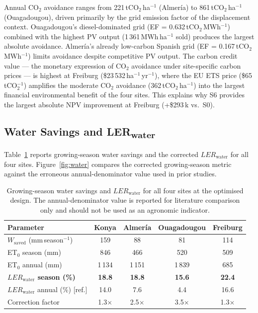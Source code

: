 \hspace{1cm}Annual CO$_2$ avoidance ranges from
221\,tCO$_2$\,ha$^{-1}$ (Almer\'{i}a) to
861\,tCO$_2$\,ha$^{-1}$ (Ouagadougou), driven primarily by the
grid emission factor of the displacement context. Ouagadougou's
diesel-dominated grid (EF = 0.632\,tCO$_2$\,MWh$^{-1}$) combined
with the highest PV output (1\,361\,MWh\,ha$^{-1}$ sold) produces
the largest absolute avoidance. Almer\'{i}a's already low-carbon
Spanish grid (EF = 0.167\,tCO$_2$\,MWh$^{-1}$) limits avoidance
despite competitive PV output. The carbon credit value --- the
monetary expression of CO$_2$ avoidance under site-specific carbon
prices --- is highest at Freiburg (\$23\,532\,ha$^{-1}$\,yr$^{-1}$),
where the EU ETS price (\$65\,tCO$_2^{-1}$) amplifies the moderate
CO$_2$ avoidance (362\,tCO$_2$\,ha$^{-1}$) into the largest
financial environmental benefit of the four sites. This explains
why S6 provides the largest absolute NPV improvement at Freiburg
(+\$293\,k vs.\ S0).

\subsection{Water Savings and LER\textsubscript{water}}
\label{sec:results_water}

\hspace{1cm}Table~\ref{tab:water} reports growing-season water savings
and the corrected $LER_{\text{water}}$ for all four sites.
Figure~\ref{fig:water} compares the corrected growing-season metric
against the erroneous annual-denominator value used in prior studies.

\begin{table}[H]
	\caption{Growing-season water savings and $LER_{\text{water}}$
		for all four sites at the optimised design. The annual-denominator
		value is reported for literature comparison only and should not
		be used as an agronomic indicator.}
	\label{tab:water}
	\centering
	\begin{tabular}{lcccc}
		\toprule
		\textbf{Parameter} & \textbf{Konya} & \textbf{Almer\'{i}a}
		& \textbf{Ouagadougou} & \textbf{Freiburg} \\
		\midrule
		$W_{\text{saved}}$ (mm\,season$^{-1}$)   & 159  & 88   & 81   & 114  \\
		ET$_0$ season (mm)                         & 846  & 466  & 520  & 509  \\
		ET$_0$ annual (mm)                         & 1\,134 & 1\,151 & 1\,839 & 685 \\
		\textbf{$LER_{\text{water}}$ season (\%)} & \textbf{18.8} & \textbf{18.8}
		& \textbf{15.6} & \textbf{22.4} \\
		$LER_{\text{water}}$ annual (\%) [ref.]   & 14.0 & 7.6  & 4.4  & 16.6 \\
		Correction factor                          & 1.3$\times$ & 2.5$\times$
		& 3.5$\times$ & 1.3$\times$ \\
		\bottomrule
	\end{tabular}
\end{table}

